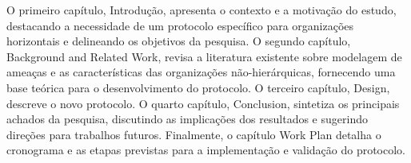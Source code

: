 O primeiro capítulo, Introdução, apresenta o contexto e a motivação do estudo,
destacando a necessidade de um protocolo específico para organizações
horizontais e delineando os objetivos da pesquisa. O segundo
capítulo, Background and Related Work, revisa a literatura existente
sobre modelagem de ameaças e as características das organizações não-hierárquicas,
fornecendo uma base teórica para o desenvolvimento do protocolo. O terceiro capítulo,
Design, descreve o novo protocolo. O quarto capítulo, Conclusion, sintetiza os principais
achados da pesquisa, discutindo as implicações dos resultados e sugerindo direções para
trabalhos futuros. Finalmente, o capítulo Work Plan detalha o cronograma e as etapas
previstas para a implementação e validação do protocolo.
